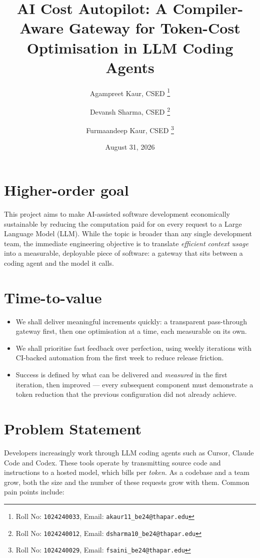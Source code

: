 \documentclass[11pt,a4paper]{article}
\title{AI Cost Autopilot: A Compiler-Aware Gateway for
  Token-Cost Optimisation in LLM Coding Agents}
\date{August 31, 2026}
\author{
  Agampreet Kaur, CSED%
  \thanks{Roll No: \texttt{1024240033}, %
    Email: \texttt{akaur11\_be24@thapar.edu}}
  \and
  Devansh Sharma, CSED%
  \thanks{Roll No: \texttt{1024240012}, %
    Email: \texttt{dsharma10\_be24@thapar.edu}}
  \and
  Furmaandeep Kaur, CSED%
  \thanks{Roll No: \texttt{1024240029}, %
    Email: \texttt{fsaini\_be24@thapar.edu}}
}
\begin{document}
\maketitle

\section{Higher-order goal}

This project aims to make AI-assisted software development economically
sustainable by reducing the computation paid for on every request to a Large
Language Model (LLM). While the topic is broader than any single development
team, the immediate engineering objective is to translate \emph{efficient
context usage} into a measurable, deployable piece of software: a gateway that
sits between a coding agent and the model it calls.

\section{Time-to-value}

\begin{itemize}[noitemsep]
  \item We shall deliver meaningful increments quickly: a transparent
        pass-through gateway first, then one optimisation at a time, each
        measurable on its own.
  \item We shall prioritise fast feedback over perfection, using weekly
        iterations with CI-backed automation from the first week to reduce
        release friction.
  \item Success is defined by what can be delivered and \emph{measured} in the
        first iteration, then improved --- every subsequent component must
        demonstrate a token reduction that the previous configuration did not
        already achieve.
\end{itemize}

\section{Problem Statement}

Developers increasingly work through LLM coding agents such as Cursor, Claude
Code and Codex. These tools operate by transmitting source code and
instructions to a hosted model, which bills per \emph{token}. As a codebase and
a team grow, both the size and the number of these requests grow with them.
Common pain points include:
\end{document}
